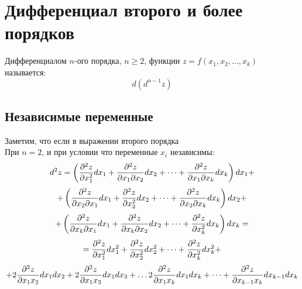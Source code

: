 \section{Дифференциал второго и более порядков}
Дифференциалом $n$-ого порядка, $n \geq 2$, функции $z=f(x_1, x_2, \dots, x_k)$ называется:
$$d(d^{n-1}z)$$
\subsection{Независимые переменные}
Заметим, что если в выражении второго порядка
$$$$
При $n = 2$, и при условии что переменные $x_i$ независимы:
$$d^2z = \left(
{\partial^2z \over \partial x_1^2}d x_1 +
{\partial^2z \over \partial x_1\partial x_2}d x_2 +
\dots +
{\partial^2z \over \partial x_1\partial x_k}d x_k  
\right)d x_1 + $$
$$ + \left(
{\partial^2z \over \partial x_2\partial x_1}d x_1 +
{\partial^2z \over \partial x_2^2}d x_2 +
\dots +
{\partial^2z \over \partial x_2\partial x_k}d x_k  
\right)d x_2 + $$
$$ + \left({\partial^2z \over \partial x_k\partial x_1}d x_1 +
{\partial^2z \over \partial x_k\partial x_2}d x_2 +
\dots +
{\partial^2z \over \partial x_k^2}d x_k  
\right)d x_k = $$
$$= {\partial^2z \over \partial x_1^2}d x_1^2 +
{\partial^2z \over \partial x_2^2}d x_2^2 +
\dots  +
{\partial^2z \over \partial x_k^2}d x_k^2 +  $$
$$+ 2 {\partial^2z \over \partial x_1x_2}dx_1dx_2 + 
2{\partial^2z \over \partial x_1x_3}dx_1dx_3 +
\dots
2{\partial^2z \over \partial x_1x_k}dx_1dx_k +
\dots  +
{\partial^2z \over \partial x_{k-1}x_k}dx_{k-1}dx_k$$

